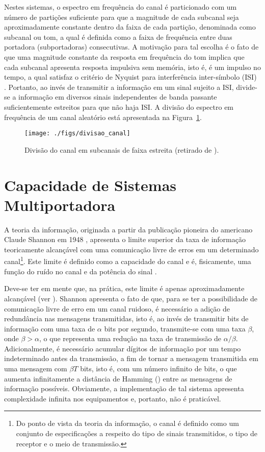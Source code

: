 Nestes sistemas,  o espectro em frequência do canal é particionado com um número de partições suficiente para que a magnitude de cada subcanal seja aproximadamente constante dentro da faixa de cada partição, denominada como subcanal ou tom, a qual é definida como a faixa de frequência entre duas portadora (subportadoras) consecutivas. A motivação para tal escolha é o fato de que uma magnitude constante da resposta em frequência do tom implica que cada subcanal apresenta resposta impulsiva sem memória, isto é, é um impulso no tempo, a qual satisfaz o critério de Nyquist para interferência inter-símbolo (ISI) \cite{proakis_dcomm}. Portanto, ao invés de transmitir a informação em um sinal sujeito a ISI, divide-se a informação em diversos sinais independentes de banda passante suficientemente estreitos para que não haja ISI. A divisão do espectro em frequência de um canal aleatório está apresentada na Figura~\ref{fig:divisao_canal}.

\begin{figure}[htbp]
\centering
\texttt{[image: ./figs/divisao\_canal]}
\caption{Divisão do canal em subcanais de faixa estreita (retirado de \cite{proakis_dcomm}).
\label{fig:divisao_canal}}
\end{figure}

\section{Capacidade de Sistemas Multiportadora}
\label{sec:capacidade_multiportadora}

A teoria da informação, originada a partir da publicação pioneira do americano Claude Shannon em 1948 \cite{shannon1948}, apresenta o limite superior da taxa de informação teoricamente alcançável com uma comunicação livre de erros em um determinado canal\footnote{Do ponto de vista da teoria da informação, o canal é definido como um conjunto de especificações a respeito do tipo de sinais transmitidos, o tipo de receptor e o meio de transmissão.}. Este limite é definido como a capacidade do canal e é, fisicamente, uma função do ruído no canal e da potência do sinal \cite{lathi2009}. 

Deve-se ter em mente que, na prática, este limite é apenas aproximadamente alcançável (ver \cite{capacityApproachingCodes}). Shannon apresenta o fato de que, para se ter a possibilidade de comunicação livre de erro em um canal ruidoso, é necessário a adição de redundância nas mensagens transmitidas, isto é, ao invés de transmitir bits de informação com uma taxa de $\alpha$ bits por segundo, transmite-se com uma taxa $\beta$, onde $\beta > \alpha$, o que representa uma redução na taxa de transmissão de $\alpha / \beta$. Adicionalmente, é necessário acumular dígitos de informação por um tempo indeterminado antes da transmissão, a fim de tornar a mensagem transmitida em uma mensagem com $\beta T$ bits, isto é, com um número infinito de bits, o que aumenta infinitamente a distância de Hamming (\cite{lathi2009}) entre as mensagens de informação possíveis. Obviamente, a implementação de tal sistema apresenta complexidade infinita nos equipamentos e, portanto, não é praticável.

